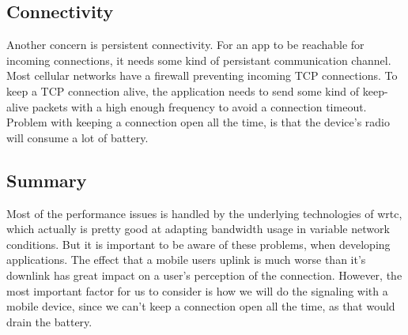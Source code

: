 \subsection{Connectivity}
Another concern is persistent connectivity. For an app to be reachable for incoming connections, it needs some kind of persistant communication channel. Most cellular networks have a firewall preventing incoming TCP connections\cite{isomaki2012considerations}. To keep a TCP connection alive, the application needs to send some kind of keep-alive packets with a high enough frequency to avoid a connection timeout. Problem with keeping a connection open all the time, is that the device's radio will consume a lot of battery. %

\subsection{Summary}
Most of the performance issues is handled by the underlying technologies of \gls{wrtc}, which actually is pretty good at adapting bandwidth usage in variable network conditions. But it is important to be aware of these problems, when developing applications. The effect that a mobile users uplink is much worse than it's downlink has great impact on a user's perception of the connection. However, the most important factor for us to consider is how we will do the signaling with a mobile device, since we can't keep a connection open all the time, as that would drain the battery.